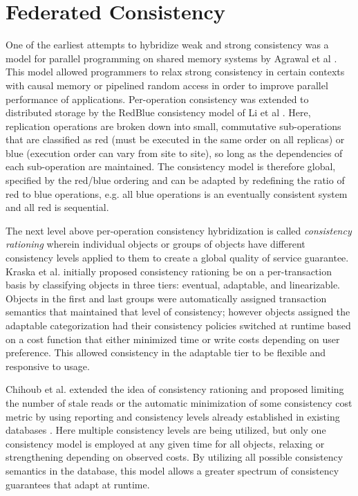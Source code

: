 \section{Federated Consistency}

One of the earliest attempts to hybridize weak and strong consistency was a
model for parallel programming on shared memory systems by Agrawal et al
\cite{agrawal_mixed_1994}.
This model allowed programmers to relax strong consistency in certain contexts
with causal memory or pipelined random access in order to improve parallel
performance of applications.
Per-operation consistency was extended to distributed storage by the RedBlue
consistency model of Li et al \cite{li_making_2012}.
Here, replication operations are broken down into small, commutative
sub-operations that are classified as red (must be executed in the same order
on all replicas) or blue (execution order can vary from site to site), so long
as the dependencies of each sub-operation are maintained.
The consistency model is therefore global, specified by the red/blue ordering
and can be adapted by redefining the ratio of red to blue operations, e.g.
all blue operations is an eventually consistent system and all red is
sequential.

The next level above per-operation consistency hybridization is called
\textit{consistency rationing} wherein individual objects or groups of objects
have different consistency levels applied to them to create a global quality
of service guarantee.
Kraska et al.
\cite{kraska_consistency_2009} initially proposed consistency rationing be on
a per-transaction basis by classifying objects in three tiers: eventual,
adaptable, and linearizable.
Objects in the first and last groups were automatically assigned transaction
semantics that maintained that level of consistency; however objects assigned
the adaptable categorization had their consistency policies switched at
runtime based on a cost function that either minimized time or write costs
depending on user preference.
This allowed consistency in the adaptable tier to be flexible and responsive
to usage.

Chihoub et al.
extended the idea of consistency rationing and proposed limiting the number of
stale reads or the automatic minimization of some consistency cost metric by
using reporting and consistency levels already established in existing
databases \cite{chihoub_harmony:_2012,chihoub_consistency_2013}.
Here multiple consistency levels are being utilized, but only one consistency
model is employed at any given time for all objects, relaxing or strengthening
depending on observed costs.
By utilizing all possible consistency semantics in the database, this model
allows a greater spectrum of consistency guarantees that adapt at runtime.

